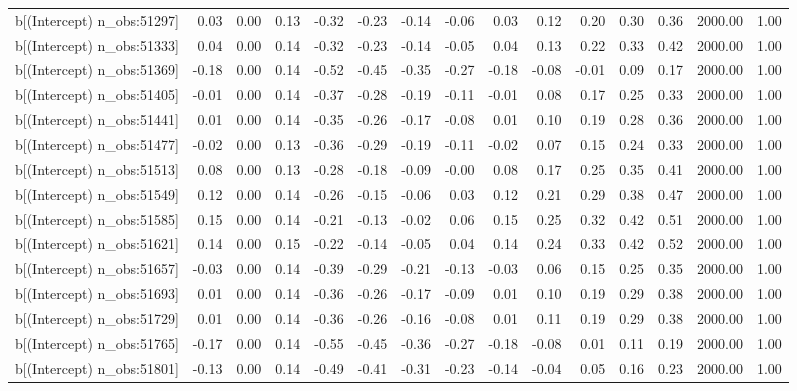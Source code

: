 \begin{table}[ht]
\begin{tabular}{rrrrrrrrrrrrrrr}
  b[(Intercept) n\_obs:51297] & 0.03 & 0.00 & 0.13 & -0.32 & -0.23 & -0.14 & -0.06 & 0.03 & 0.12 & 0.20 & 0.30 & 0.36 & 2000.00 & 1.00 \\ 
  b[(Intercept) n\_obs:51333] & 0.04 & 0.00 & 0.14 & -0.32 & -0.23 & -0.14 & -0.05 & 0.04 & 0.13 & 0.22 & 0.33 & 0.42 & 2000.00 & 1.00 \\ 
  b[(Intercept) n\_obs:51369] & -0.18 & 0.00 & 0.14 & -0.52 & -0.45 & -0.35 & -0.27 & -0.18 & -0.08 & -0.01 & 0.09 & 0.17 & 2000.00 & 1.00 \\ 
  b[(Intercept) n\_obs:51405] & -0.01 & 0.00 & 0.14 & -0.37 & -0.28 & -0.19 & -0.11 & -0.01 & 0.08 & 0.17 & 0.25 & 0.33 & 2000.00 & 1.00 \\ 
  b[(Intercept) n\_obs:51441] & 0.01 & 0.00 & 0.14 & -0.35 & -0.26 & -0.17 & -0.08 & 0.01 & 0.10 & 0.19 & 0.28 & 0.36 & 2000.00 & 1.00 \\ 
  b[(Intercept) n\_obs:51477] & -0.02 & 0.00 & 0.13 & -0.36 & -0.29 & -0.19 & -0.11 & -0.02 & 0.07 & 0.15 & 0.24 & 0.33 & 2000.00 & 1.00 \\ 
  b[(Intercept) n\_obs:51513] & 0.08 & 0.00 & 0.13 & -0.28 & -0.18 & -0.09 & -0.00 & 0.08 & 0.17 & 0.25 & 0.35 & 0.41 & 2000.00 & 1.00 \\ 
  b[(Intercept) n\_obs:51549] & 0.12 & 0.00 & 0.14 & -0.26 & -0.15 & -0.06 & 0.03 & 0.12 & 0.21 & 0.29 & 0.38 & 0.47 & 2000.00 & 1.00 \\ 
  b[(Intercept) n\_obs:51585] & 0.15 & 0.00 & 0.14 & -0.21 & -0.13 & -0.02 & 0.06 & 0.15 & 0.25 & 0.32 & 0.42 & 0.51 & 2000.00 & 1.00 \\ 
  b[(Intercept) n\_obs:51621] & 0.14 & 0.00 & 0.15 & -0.22 & -0.14 & -0.05 & 0.04 & 0.14 & 0.24 & 0.33 & 0.42 & 0.52 & 2000.00 & 1.00 \\ 
  b[(Intercept) n\_obs:51657] & -0.03 & 0.00 & 0.14 & -0.39 & -0.29 & -0.21 & -0.13 & -0.03 & 0.06 & 0.15 & 0.25 & 0.35 & 2000.00 & 1.00 \\ 
  b[(Intercept) n\_obs:51693] & 0.01 & 0.00 & 0.14 & -0.36 & -0.26 & -0.17 & -0.09 & 0.01 & 0.10 & 0.19 & 0.29 & 0.38 & 2000.00 & 1.00 \\ 
  b[(Intercept) n\_obs:51729] & 0.01 & 0.00 & 0.14 & -0.36 & -0.26 & -0.16 & -0.08 & 0.01 & 0.11 & 0.19 & 0.29 & 0.38 & 2000.00 & 1.00 \\ 
  b[(Intercept) n\_obs:51765] & -0.17 & 0.00 & 0.14 & -0.55 & -0.45 & -0.36 & -0.27 & -0.18 & -0.08 & 0.01 & 0.11 & 0.19 & 2000.00 & 1.00 \\ 
  b[(Intercept) n\_obs:51801] & -0.13 & 0.00 & 0.14 & -0.49 & -0.41 & -0.31 & -0.23 & -0.14 & -0.04 & 0.05 & 0.16 & 0.23 & 2000.00 & 1.00 \\ 

\end{tabular}
\end{table}

